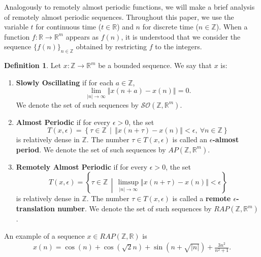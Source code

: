 \documentclass[english,,reqno]{amsart}
\numberwithin{equation}{section}
\theoremstyle{plain}
\theoremstyle{definition}
\newtheorem{defn}{Definition}[section]
\theoremstyle{remark}
\begin{document}
Analogously to remotely almost periodic functions, we will make a brief analysis of remotely almost periodic sequences. Throughout this paper, we use the variable $t$ for continuous time ($t \in \mathbb{R}$) and $n$ for discrete time ($n \in \mathbb{Z}$). When a function $f : \mathbb{R} \to \mathbb{R}^m$ appears as $f(n)$, it is understood that we consider the sequence $\{f(n)\}_{n \in \mathbb{Z}}$ obtained by restricting $f$ to the integers.


\begin{defn}
Let $x:\mathbb{Z}\rightarrow\mathbb{R}^{m}$ be a bounded sequence. We say that $x$ is:
\begin{enumerate}[label=(\roman*)]
\item \textbf{Slowly Oscillating} if for each $a\in\mathbb{Z}$,  
\[
\lim_{\left|n\right|\rightarrow\infty}\left\Vert x\left(n+a\right)-x\left(n\right)\right\Vert=0.
\]  
We denote the set of such sequences by $\mathcal{SO}\left(\mathbb{Z},\mathbb{R}^{m}\right)$.

\item \textbf{Almost Periodic} if for every $\epsilon > 0$, the set  
\[
T\left(x,\epsilon\right)=\left\{ \tau\in\mathbb{Z} \,\middle\vert\, \left\Vert x\left(n+\tau\right)-x\left(n\right)\right\Vert <\epsilon,\ \forall n\in \mathbb{Z} \right\}
\]  
is relatively dense in $\mathbb{Z}$. The number $\tau\in T\left(x,\epsilon\right)$ is called an \textbf{$\epsilon$-almost period}. We denote the set of such sequences by $AP\left(\mathbb{Z},\mathbb{R}^{m}\right)$.

\item \textbf{Remotely Almost Periodic} if for every $\epsilon > 0$, the set  
\[
T\left(x,\epsilon\right)=\left\{ \tau\in\mathbb{Z} \,\middle|\, \limsup_{\left|n\right|\rightarrow\infty}\left\Vert x\left(n+\tau\right)-x\left(n\right)\right\Vert<\epsilon \right\}
\]  
is relatively dense in $\mathbb{Z}$. The number $\tau\in T\left(x,\epsilon\right)$ is called a \textbf{remote $\epsilon$-translation number}. We denote the set of such sequences by $RAP\left(\mathbb{Z},\mathbb{R}^{m}\right)$.
\end{enumerate}
\end{defn}

An example of a sequence $x\in RAP(\mathbb{Z},\mathbb{R})$ is  
\begin{eqnarray*}
x\left(n\right)=\cos\left(n\right)+\cos\left(\sqrt{2}n\right)+\sin(n+\sqrt{\vert n\vert })+\frac{3n^{2}}{n^{2}+1}.
\end{eqnarray*}   
\end{document}
